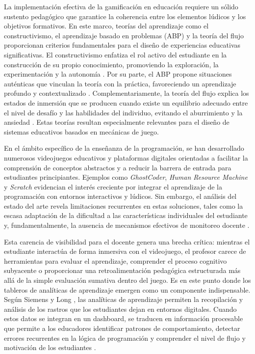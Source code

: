 La implementación efectiva de la gamificación en educación requiere un sólido sustento pedagógico que garantice la coherencia entre los elementos lúdicos y los objetivos formativos. En este marco, teorías del aprendizaje como el constructivismo, el aprendizaje basado en problemas (ABP) y la teoría del flujo proporcionan criterios fundamentales para el diseño de experiencias educativas significativas. El constructivismo enfatiza el rol activo del estudiante en la construcción de su propio conocimiento, promoviendo la exploración, la experimentación y la autonomía \cite{kiili_design_2012}. Por su parte, el ABP propone situaciones auténticas que vinculan la teoría con la práctica, favoreciendo un aprendizaje profundo y contextualizado \cite{ruiz-meza_application_nodate}. Complementariamente, la teoría del flujo explica los estados de inmersión que se producen cuando existe un equilibrio adecuado entre el nivel de desafío y las habilidades del individuo, evitando el aburrimiento y la ansiedad \cite{kiili_design_2012, bozkurt_systematic_2018}. Estas teorías resultan especialmente relevantes para el diseño de sistemas educativos basados en mecánicas de juego.

En el ámbito específico de la enseñanza de la programación, se han desarrollado numerosos videojuegos educativos y plataformas digitales orientadas a facilitar la comprensión de conceptos abstractos y a reducir la barrera de entrada para estudiantes principiantes. Ejemplos como \textit{GhostCoder}, \textit{Human Resource Machine} y \textit{Scratch} evidencian el interés creciente por integrar el aprendizaje de la programación con entornos interactivos y lúdicos. Sin embargo, el análisis del estado del arte revela limitaciones recurrentes en estas soluciones, tales como la escasa adaptación de la dificultad a las características individuales del estudiante y, fundamentalmente, la ausencia de mecanismos efectivos de monitoreo docente \cite{shum_personalised_2023, Zhang_Wong_Chan_2023, velasco-ramirez_impacto_2023}. 

Esta carencia de visibilidad para el docente genera una brecha crítica: mientras el estudiante interactúa de forma inmersiva con el videojuego, el profesor carece de herramientas para evaluar el aprendizaje, comprender el proceso cognitivo subyacente o proporcionar una retroalimentación pedagógica estructurada más allá de la simple evaluación sumativa dentro del juego. Es en este punto donde los tableros de analíticas de aprendizaje emergen como un componente indispensable. Según Siemens y Long \cite{siemens_learning_2013}, las analíticas de aprendizaje permiten la recopilación y análisis de los rastros que los estudiantes dejan en entornos digitales. Cuando estos datos se integran en un dashboard, se traducen en información procesable que permite a los educadores identificar patrones de comportamiento, detectar errores recurrentes en la lógica de programación y comprender el nivel de flujo y motivación de los estudiantes \cite{rahimi2021learning, susnjak_learning_2022}.

